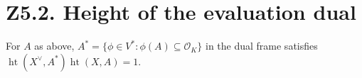 \section*{Z5.2. Height of the evaluation dual}

\begin{lemma}\label{lem:P5-eval-realize}
For $A$ as above, $A^*=\{\phi\in V^*:\phi(A)\subseteq\mathcal O_K\}$
in the dual frame satisfies
$\operatorname{ht}(X^\vee,A^*)\operatorname{ht}(X,A)=1$.
\end{lemma}

